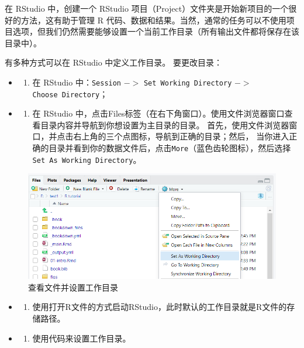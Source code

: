 \documentclass[
]{book}
\providecommand{\tightlist}{%
  \setlength{\itemsep}{0pt}\setlength{\parskip}{0pt}}
\begin{document}
在 RStudio 中，创建一个 RStudio 项目（Project）文件夹是开始新项目的一个很好的方法，这有助于管理 R 代码、数据和结果。当然，通常的任务可以不使用项目选项，但我们仍然需要能够设置一个当前工作目录（所有输出文件都将保存在该目录中）。

有多种方式可以在 RStudio 中定义工作目录。
要更改目录：

\begin{itemize}
\item
  \begin{enumerate}
  \def\labelenumi{\arabic{enumi}.}
  \tightlist
  \item
    在 RStudio 中：\texttt{Session} \(->\) \texttt{Set\ Working\ Directory} \(->\) \texttt{Choose\ Directory}；
  \end{enumerate}
\item
  \begin{enumerate}
  \def\labelenumi{\arabic{enumi}.}
  \setcounter{enumi}{1}
  \tightlist
  \item
    在 RStudio 中，点击Files标签（在右下角窗口）。使用文件浏览器窗口查看目录内容并导航到你想设置为主目录的目录。
    首先，使用文件浏览器窗口，并点击右上角的三个点图标，导航到正确的目录；然后， 当你进入正确的目录并看到你的数据文件后，点击\texttt{More}（蓝色齿轮图标），然后选择\texttt{Set\ As\ Working\ Directory}。
  \end{enumerate}
\end{itemize}

\begin{figure}

{\centering \includegraphics[width=0.8\linewidth]{figs/04-wd} 

}

\caption{查看文件并设置工作目录}\label{fig:setwd}
\end{figure}

\begin{itemize}
\item
  \begin{enumerate}
  \def\labelenumi{\arabic{enumi}.}
  \setcounter{enumi}{2}
  \tightlist
  \item
    使用打开R文件的方式启动RStudio，此时默认的工作目录就是R文件的存储路径。
  \end{enumerate}
\item
  \begin{enumerate}
  \def\labelenumi{\arabic{enumi}.}
  \setcounter{enumi}{3}
  \tightlist
  \item
    使用代码来设置工作目录。
  \end{enumerate}
\end{itemize}
\end{document}
